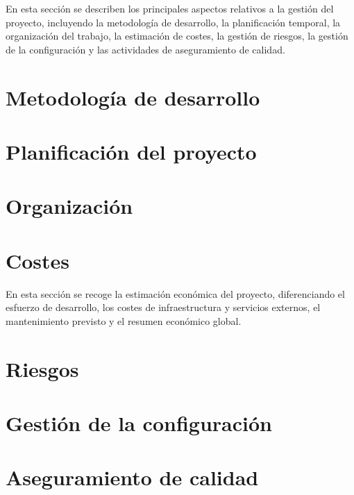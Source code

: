 En esta sección se describen los principales aspectos relativos a la gestión del proyecto, incluyendo la metodología de desarrollo, la planificación temporal, la organización del trabajo, la estimación de costes, la gestión de riesgos, la gestión de la configuración y las actividades de aseguramiento de calidad.

\section{Metodología de desarrollo}
\label{sec:methodology}


% 

\section{Planificación del proyecto}
\label{sec:planning}


\section{Organización}
\label{sec:project-organization}


\section{Costes}
\label{sec:costs}

En esta sección se recoge la estimación económica del proyecto, diferenciando el esfuerzo de desarrollo, los costes de infraestructura y servicios externos, el mantenimiento previsto y el resumen económico global.



\section{Riesgos}
\label{sec:risks}


\section{Gestión de la configuración}
\label{sec:configuration}


\section{Aseguramiento de calidad}
\label{sec:quality}


